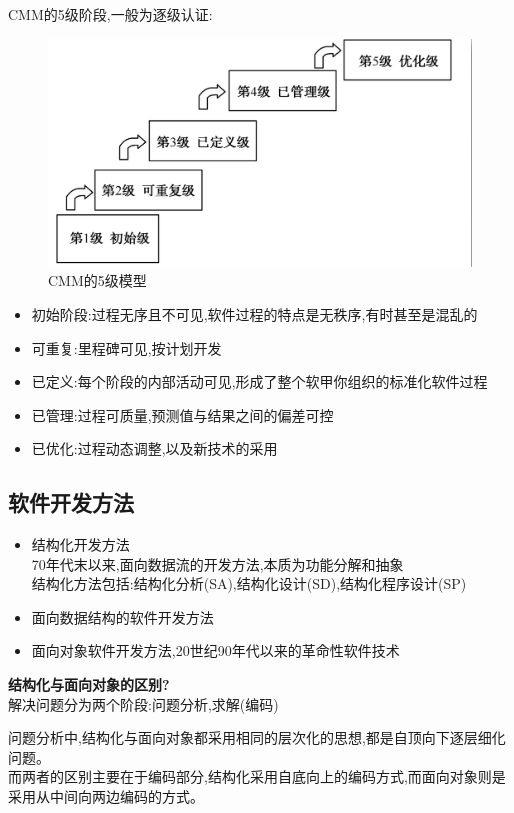 \documentclass[UTF8,a4paper]{ctexart}
\begin{document}
CMM的5级阶段,一般为逐级认证:
\begin{figure}[H]
  \centering
  \includegraphics[scale = 0.3]{assets/SoftwareEngineering_c1bf0.png}
  \caption{CMM的5级模型}
\end{figure}

\begin{itemize}
  \item 初始阶段:过程无序且不可见,软件过程的特点是无秩序,有时甚至是混乱的
  \item 可重复:里程碑可见,按计划开发
  \item 已定义:每个阶段的内部活动可见,形成了整个软甲你组织的标准化软件过程
  \item 已管理:过程可质量,预测值与结果之间的偏差可控
  \item 已优化:过程动态调整,以及新技术的采用
\end{itemize}

\subsection{软件开发方法}

\begin{itemize}
  \item 结构化开发方法 \\
  70年代末以来,面向数据流的开发方法,本质为功能分解和抽象\\
  结构化方法包括:结构化分析(SA),结构化设计(SD),结构化程序设计(SP)
  \item 面向数据结构的软件开发方法
  \item 面向对象软件开发方法,20世纪90年代以来的革命性软件技术
\end{itemize}

\textbf{结构化与面向对象的区别?}\\
解决问题分为两个阶段:问题分析,求解(编码)

问题分析中,结构化与面向对象都采用相同的层次化的思想,都是自顶向下逐层细化问题。\\
而两者的区别主要在于编码部分,结构化采用自底向上的编码方式,而面向对象则是采用从中间向两边编码的方式。
\end{document}
